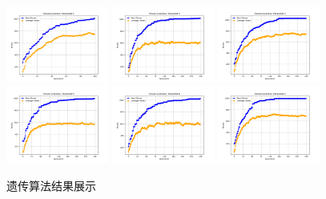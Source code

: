 \documentclass[journal,twoside,web]{ieeecolor}
\begin{document}
\begin{figure}
    \centering
    \includegraphics[width=0.3\textwidth]{img/Figure_1.png}
    \centering
    \includegraphics[width=0.3\textwidth]{img/Figure_4.png}
    \centering
    \includegraphics[width=0.3\textwidth]{img/Figure_3.png}
    \centering
    \includegraphics[width=0.3\textwidth]{img/Figure_5.png}
    \centering
    \includegraphics[width=0.3\textwidth]{img/Figure_6.png}
    \centering
    \includegraphics[width=0.3\textwidth]{img/Figure_12.png}
    \caption{遗传算法结果展示}
\end{figure}
\end{document}
